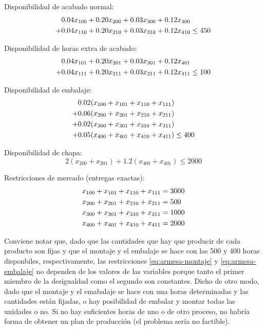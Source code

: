 Disponibilidad de acabado normal:
\begin{align}
0.04x_{100}+0.20x_{200}+0.03x_{300}+0.12x_{400} & \notag \\
+0.04x_{110}+0.20x_{210}+0.03x_{310}+0.12x_{410} & \leq 450
\end{align}


Disponibilidad de horas extra de acabado:
\begin{align}
0.04x_{101}+0.20x_{201}+0.03x_{301}+0.12x_{401} & \notag \\
+0.04x_{111}+0.20x_{211}+0.03x_{311}+0.12x_{411} & \leq 100
\end{align}


Disponibilidad de embalaje:
\begin{align}
0.02(x_{100}+x_{101}+x_{110}+x_{111}) & \notag \\
+0.06(x_{200}+x_{201}+x_{210}+x_{211}) & \notag \\
+0.02(x_{300}+x_{301}+x_{310}+x_{311}) & \notag \\
+0.05(x_{400}+x_{401}+x_{410}+x_{411}) & \leq 400
\label{eq:armesa-embalaje}
\end{align}

Disponibilidad de chapa:
\begin{equation}
2(x_{200}+x_{201}) + 1.2(x_{400}+x_{401}) \leq 2000
\end{equation}

Restricciones de mercado (entregas exactas):
\begin{align}
x_{100}+x_{101}+x_{110}+x_{111} &= 3000 \notag\\
x_{200}+x_{201}+x_{210}+x_{211} &= 500 \notag \\
x_{300}+x_{301}+x_{310}+x_{311} &= 1000 \notag\\
x_{400}+x_{401}+x_{410}+x_{411} &= 2000
\end{align}


Conviene notar que, dado que las cantidades que hay que producir de cada producto son fijas y que el montaje y el embalaje se hace con las 500 y 400 horas disponbiles, respectivamente, las restricciones \ref{eq:armesa-montaje} y \ref{eq:armesa-embalaje} no dependen de los valores de las variables porque tanto el primer miembro de la desigualdad como el segundo son constantes. Dicho de otro modo, dado que el montaje y el emabalaje se hace con una horas determinadas y las cantidades están fijadas, o hay posibilidad de embalar y montar todas las unidades o no. Si no hay suficientes horas de uno o de otro proceso, no habría forma de obtener un plan de producción (el problema sería no factible).



